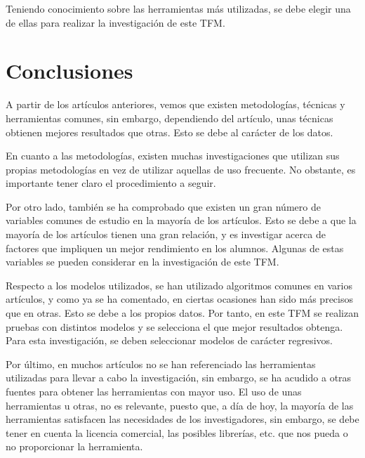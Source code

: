 Teniendo conocimiento sobre las herramientas más utilizadas, se debe elegir una de ellas para realizar la investigación de este TFM.



\section{Conclusiones}

A partir de los artículos anteriores, vemos que existen metodologías, técnicas y herramientas comunes, sin embargo, dependiendo del artículo, unas técnicas obtienen mejores resultados que otras. Esto se debe al carácter de los datos. 

En cuanto a las metodologías, existen muchas investigaciones que utilizan sus propias metodologías en vez de utilizar aquellas de uso frecuente. No obstante, es importante tener claro el procedimiento a seguir.

Por otro lado, también se ha comprobado que existen un gran número de variables comunes de estudio en la mayoría de los artículos. Esto se debe a que la mayoría de los artículos tienen una gran relación, y es investigar acerca de factores que impliquen un mejor rendimiento en los alumnos. Algunas de estas variables se pueden considerar en la investigación de este TFM.

Respecto a los modelos utilizados, se han utilizado algoritmos comunes en varios artículos, y como ya se ha comentado, en ciertas ocasiones han sido más precisos que en otras. Esto se debe a los propios datos. Por tanto, en este TFM se realizan pruebas con distintos modelos y se selecciona el que mejor resultados obtenga. Para esta investigación, se deben seleccionar modelos de carácter regresivos.

Por último, en muchos artículos no se han referenciado las herramientas utilizadas para llevar a cabo la investigación, sin embargo, se ha acudido a otras fuentes para obtener las herramientas con mayor uso. El uso de unas herramientas u otras, no es relevante, puesto que, a día de hoy, la mayoría de las herramientas satisfacen las necesidades de los investigadores, sin embargo, se debe tener en cuenta la licencia comercial, las posibles librerías, etc. que nos pueda o no proporcionar la herramienta.

